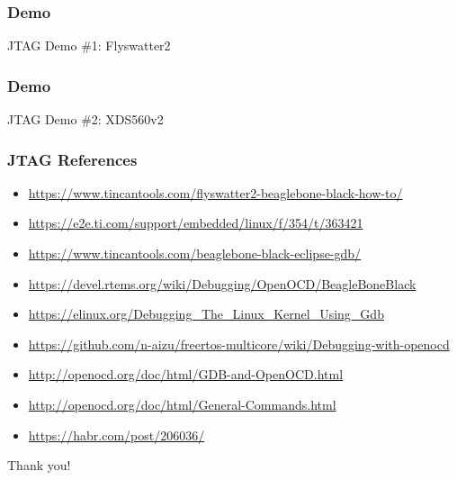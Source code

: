 \begin{frame}[standout]
  \frametitle{Demo}
  JTAG Demo \#1: Flyswatter2
\end{frame}

\begin{frame}[standout]
  \frametitle{Demo}
  JTAG Demo \#2: XDS560v2
\end{frame}

\begin{frame}
  \frametitle{JTAG References}
  \begin{itemize}
    \item \url{https://www.tincantools.com/flyswatter2-beaglebone-black-how-to/}
    \item \url{https://e2e.ti.com/support/embedded/linux/f/354/t/363421}
    \item \url{https://www.tincantools.com/beaglebone-black-eclipse-gdb/}
    \item \url{https://devel.rtems.org/wiki/Debugging/OpenOCD/BeagleBoneBlack}
    \item \url{https://elinux.org/Debugging\_The\_Linux\_Kernel\_Using\_Gdb}
    \item \url{https://github.com/n-aizu/freertos-multicore/wiki/Debugging-with-openocd}
    \item \url{http://openocd.org/doc/html/GDB-and-OpenOCD.html}
    \item \url{http://openocd.org/doc/html/General-Commands.html}
    \item \url{https://habr.com/post/206036/}
  \end{itemize}
  \vspace*{-10mm}
\end{frame}

\begin{frame}[standout]
  Thank you!
\end{frame}


